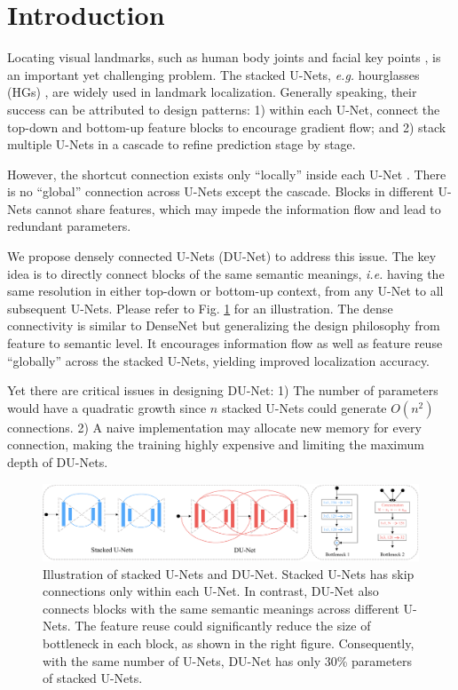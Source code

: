 \section{Introduction}

Locating visual landmarks, such as human body joints \cite{toshev2014deeppose} and facial key points \cite{xiong2013supervised}, is an important yet challenging problem. The stacked U-Nets, {\it e.g.} hourglasses (HGs) \cite{newell2016stacked}, are widely used in landmark localization. Generally speaking, their success can be attributed to design patterns: 1) within each U-Net, connect the top-down and bottom-up feature blocks to encourage gradient flow; and 2) stack multiple U-Nets in a cascade to refine prediction stage by stage.

However, the shortcut connection exists only ``locally'' inside each U-Net \cite{ronneberger2015u}. There is no ``global'' connection across U-Nets except the cascade. Blocks in different U-Nets cannot share features, which may impede the information flow and lead to redundant parameters.

We propose densely connected U-Nets (DU-Net) to address this issue. The key idea is to directly connect blocks of the same semantic meanings, {\it i.e.} having the same resolution in either top-down or bottom-up context, from any U-Net to all subsequent U-Nets. Please refer to Fig. \ref{fig:framework} for an illustration. The dense connectivity is similar to DenseNet \cite{huang2016densely} but generalizing the design philosophy from feature to semantic level. It encourages information flow as well as feature reuse ``globally'' across the stacked U-Nets, yielding improved localization accuracy. 

Yet there are critical issues in designing DU-Net: 1) The number of parameters would have a quadratic growth since $n$ stacked U-Nets could generate $O(n^2)$ connections. 2) A naive implementation may allocate new memory for every connection, making the training highly expensive and limiting the maximum depth of DU-Nets. 




\begin{figure}[t!]
\centering
  \includegraphics[width=1.0\linewidth]{figures/framework-cropped.pdf}
\caption{Illustration of stacked U-Nets and DU-Net. Stacked U-Nets has skip connections only within each U-Net. In contrast, DU-Net also connects blocks with the same semantic meanings across different U-Nets. The feature reuse could significantly reduce the size of bottleneck in each block, as shown in the right figure. Consequently, with the same number of U-Nets, DU-Net has only 30\% parameters of stacked U-Nets.}
\label{fig:framework}
\end{figure}

